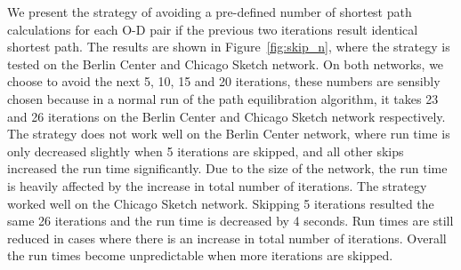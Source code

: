 We present the strategy of avoiding a pre-defined number of shortest path calculations for each O-D pair if the previous two iterations result identical shortest path.
The results are shown in Figure~\ref{fig:skip_n},
where the strategy is tested on the Berlin Center and Chicago Sketch network.
On both networks,
we choose to avoid the next 5, 10, 15 and 20 iterations,
these numbers are sensibly chosen because in a normal run of the path equilibration algorithm, it takes 23 and 26 iterations on the Berlin Center and Chicago Sketch network respectively.
The strategy does not work well on the Berlin Center network,
where run time is only decreased slightly when 5 iterations are skipped,
and all other skips increased the run time significantly.
Due to the size of the network,
the run time is heavily affected by the increase in total number of iterations.
The strategy worked well on the Chicago Sketch network.
Skipping 5 iterations resulted the same 26 iterations and the run time is decreased by 4 seconds.
Run times are still reduced in cases where there is an increase in total number of iterations.
Overall the run times become unpredictable when more iterations are skipped.

